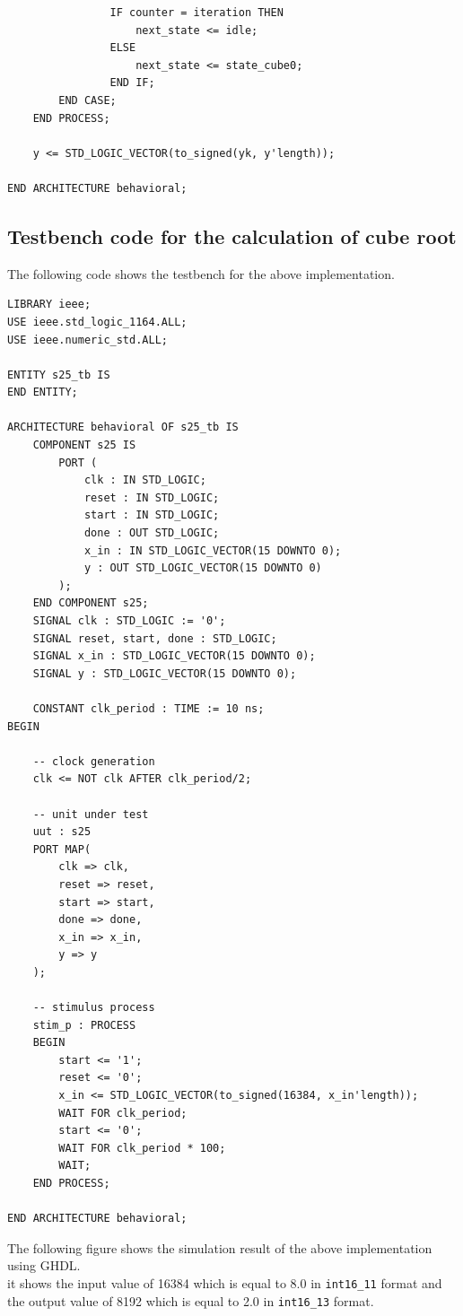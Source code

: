 \documentclass[11pt, a4paper]{report}
\begin{document}
\begin{verbatim}
                IF counter = iteration THEN
                    next_state <= idle;
                ELSE
                    next_state <= state_cube0;
                END IF;
        END CASE;
    END PROCESS;

    y <= STD_LOGIC_VECTOR(to_signed(yk, y'length));

END ARCHITECTURE behavioral;
\end{verbatim}

\subsection{Testbench code for the calculation of cube root}
The following code shows the testbench for the above implementation.

\begin{verbatim}
LIBRARY ieee;
USE ieee.std_logic_1164.ALL;
USE ieee.numeric_std.ALL;

ENTITY s25_tb IS
END ENTITY;

ARCHITECTURE behavioral OF s25_tb IS
    COMPONENT s25 IS
        PORT (
            clk : IN STD_LOGIC;
            reset : IN STD_LOGIC;
            start : IN STD_LOGIC;
            done : OUT STD_LOGIC;
            x_in : IN STD_LOGIC_VECTOR(15 DOWNTO 0);
            y : OUT STD_LOGIC_VECTOR(15 DOWNTO 0)
        );
    END COMPONENT s25;
    SIGNAL clk : STD_LOGIC := '0';
    SIGNAL reset, start, done : STD_LOGIC;
    SIGNAL x_in : STD_LOGIC_VECTOR(15 DOWNTO 0);
    SIGNAL y : STD_LOGIC_VECTOR(15 DOWNTO 0);

    CONSTANT clk_period : TIME := 10 ns;
BEGIN

    -- clock generation 
    clk <= NOT clk AFTER clk_period/2;

    -- unit under test 
    uut : s25
    PORT MAP(
        clk => clk,
        reset => reset,
        start => start,
        done => done,
        x_in => x_in,
        y => y
    );

    -- stimulus process 
    stim_p : PROCESS
    BEGIN
        start <= '1';
        reset <= '0';
        x_in <= STD_LOGIC_VECTOR(to_signed(16384, x_in'length));
        WAIT FOR clk_period;
        start <= '0';
        WAIT FOR clk_period * 100;
        WAIT;
    END PROCESS;

END ARCHITECTURE behavioral;
\end{verbatim}

The following figure shows the simulation result of the above implementation using GHDL. \\ 
it shows the input value of 16384 which is equal to 8.0 in \texttt{int16\_11} format and the output value of 8192 which is equal to 2.0 in \texttt{int16\_13} format.
\end{document}
